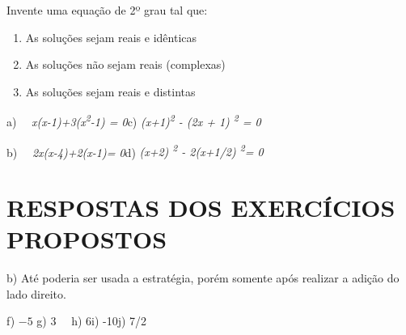 \begin{exercicios}
	\item{ Invente uma equação de 2º grau tal que:}

\begin{enumerate}[label=\alph*)]
	\item As soluções sejam reais e idênticas

	\item As soluções não sejam reais (complexas)

	\item As soluções sejam reais e distintas
\end{enumerate}


a)~~ \textit{x(x-1)+3(x\textsuperscript{2}-1) = 0\quad \quad }\quad c)  \textit{(x+1)\textsuperscript{2} - (2x + 1)\textsuperscript{ 2} = 0}

b)~~ \textit{2x(x-4)+2(x-1)= 0\quad \quad }\quad d) \textit{(x+2)\textsuperscript{ 2} - 2(x+1/2)\textsuperscript{ 2}= 0}

\end{exercicios}

\section{RESPOSTAS DOS EXERCÍCIOS PROPOSTOS}

\begin{respostas}{3}

	b) Até poderia ser usada a estratégia, porém somente após realizar a adição do lado direito.



    f)  \( -5 \) \quad \quad g) 3\quad ~~ h) 6\quad \quad i) -10\quad \quad j) 7/2\quad








\end{respostas}

